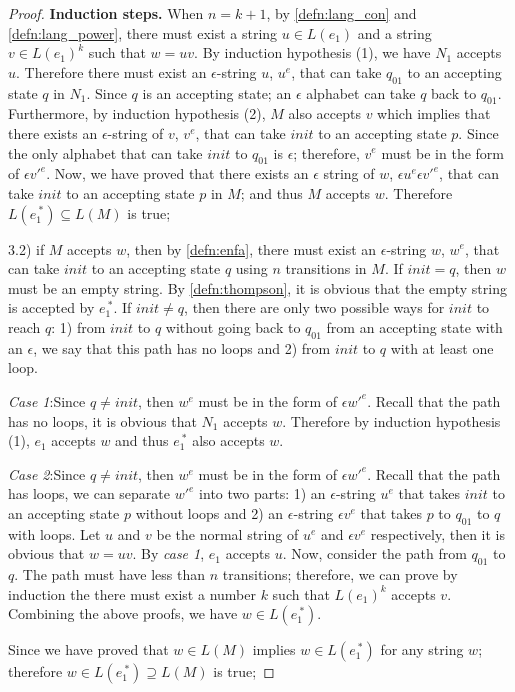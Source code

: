\begin{proof}
\par \quad \textbf{Induction steps.} \quad When \(n = k + 1\), by
\autoref{defn:lang_con} and \autoref{defn:lang_power}, there must
exist a string \(u \in L(e_1)\) and a string \(v \in L(e_1)^k\) such
that \(w=uv\). By induction hypothesis (1), we have \(N_1\) accepts \(u\). Therefore there must exist an \(\epsilon\)-string
\(u\), \(u^e\), that can take \(q_{01}\) to an accepting state \(q\)
in \(N_1\). Since \(q\) is an accepting state; an \(\epsilon\)
alphabet can take \(q\) back to \(q_{01}\). Furthermore, by induction
hypothesis (2), \(M\) also accepts \(v\) which implies that there
exists an \(\epsilon\)-string of \(v\), \(v^e\), that can take
\(init\) to an accepting state \(p\). Since the only
alphabet that can take \(init\) to \(q_{01}\) is \(\epsilon\); therefore,
\(v^e\) must be in the form of \(\epsilon v'^e\). Now, we have proved
that there exists an \(\epsilon\) string of \(w\), \(\epsilon u^e\epsilon v'^e\), that can
take \(init\) to an accepting state \(p\) in \(M\); and thus \(M\)
accepts \(w\). Therefore \(L(e_1^{\ *}) \subseteq L(M)\) is true; 

\par 3.2) if \(M\) accepts \(w\), then by \autoref{defn:enfa}, there must exist an
\(\epsilon\)-string \(w\), \(w^e\), that can take \(init\) to an accepting
state \(q\) using \(n\) transitions in \(M\).  If \(init = q\), then \(w\) must be an empty
string. By \autoref{defn:thompson}, it is obvious that
the empty string is accepted by \(e_1^{\ *}\). If \(init \neq q\),
then there are only two possible ways for \(init\)
to reach \(q\): 1) from \(init\) to \(q\) without going back to
\(q_{01}\) from an accepting state with an \(\epsilon\), we say that this path has no loops and 2) from \(init\)
to \(q\) with at least one loop. 
\par \quad \textit{Case 1}:\quad Since \(q \neq init\), then \(w^e\) must
be in the form of \(\epsilon w'^e\). Recall that the path has no loops, it is
obvious that \(N_1\) accepts \(w\). Therefore by
induction hypothesis (1), \(e_1\) accepts \(w\) and thus \(e_1^{\ *}\)
also accepts \(w\). 
\par \quad \textit{Case 2}:\quad Since \(q \neq init\), then \(w^e\) must
be in the form of \(\epsilon w'^e\). Recall that the path has loops, we
can separate \(w'^e\) into two parts: 1) an \(\epsilon\)-string
\(u^e\) that takes \(init\) to an accepting state \(p\) without loops
and 2) an \(\epsilon\)-string \(\epsilon v^e\) that takes \(p\) to
\(q_{01}\) to \(q\) with loops. Let \(u\) and \(v\) be the normal
string of \(u^e\) and \(\epsilon v^e\) respectively, then it is obvious that
\(w = uv\). By \textit{case 1}, \(e_1\) accepts \(u\). Now, consider
the path from \(q_{01}\) to \(q\). The path must have less than \(n\)
transitions; therefore, we can prove by induction the there must exist a number \(k\) such that
\(L(e_1)^k\) accepts \(v\). Combining the above proofs, we have \(w \in
L(e_1^{\ *})\). 
\par \quad Since we have proved that \(w \in L(M)\) implies \(w \in L(e_1^{\
  *})\) for any string \(w\); therefore \(w \in L(e_1^{\ *}) \supseteq L(M)\) is true; 


\end{proof}
